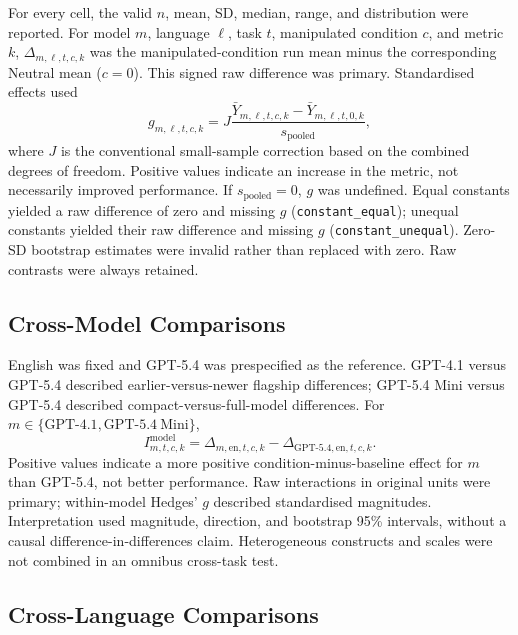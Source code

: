 \documentclass[logo,msc]{infthesis}
\begin{document}
For every cell, the valid $n$, mean, SD, median, range, and distribution were reported. For model $m$, language $\ell$, task $t$, manipulated condition $c$, and metric $k$, $\Delta_{m,\ell,t,c,k}$ was the manipulated-condition run mean minus the corresponding Neutral mean ($c=0$). This signed raw difference was primary. Standardised effects used
\[
g_{m,\ell,t,c,k}=J\frac{\bar Y_{m,\ell,t,c,k}-\bar Y_{m,\ell,t,0,k}}{s_{\mathrm{pooled}}},
\]
where $J$ is the conventional small-sample correction based on the combined degrees of freedom. Positive values indicate an increase in the metric, not necessarily improved performance. If $s_{\mathrm{pooled}}=0$, $g$ was undefined. Equal constants yielded a raw difference of zero and missing $g$ (\texttt{constant\_equal}); unequal constants yielded their raw difference and missing $g$ (\texttt{constant\_unequal}). Zero-SD bootstrap estimates were invalid rather than replaced with zero. Raw contrasts were always retained.

\subsection{Cross-Model Comparisons}

English was fixed and GPT-5.4 was prespecified as the reference. GPT-4.1 versus GPT-5.4 described earlier-versus-newer flagship differences; GPT-5.4 Mini versus GPT-5.4 described compact-versus-full-model differences. For $m\in\{\mathrm{GPT\mbox{-}4.1},\mathrm{GPT\mbox{-}5.4\ Mini}\}$,
\[
I^{\mathrm{model}}_{m,t,c,k}=\Delta_{m,\mathrm{en},t,c,k}-\Delta_{\mathrm{GPT\mbox{-}5.4},\mathrm{en},t,c,k}.
\]
Positive values indicate a more positive condition-minus-baseline effect for $m$ than GPT-5.4, not better performance. Raw interactions in original units were primary; within-model Hedges' $g$ described standardised magnitudes. Interpretation used magnitude, direction, and bootstrap 95\% intervals, without a causal difference-in-differences claim. Heterogeneous constructs and scales were not combined in an omnibus cross-task test.

\subsection{Cross-Language Comparisons}
\end{document}
